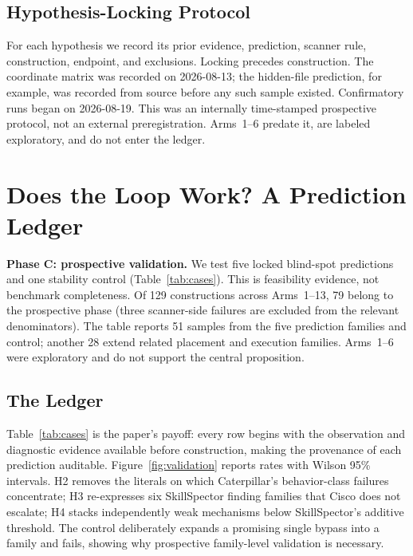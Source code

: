 \documentclass[sigconf,nonacm]{acmart}
\begin{document}
\subsection{Hypothesis-Locking Protocol}
For each hypothesis we record its prior evidence, prediction, scanner rule, construction, endpoint, and exclusions. Locking precedes construction. The coordinate matrix was recorded on 2026-08-13; the hidden-file prediction, for example, was recorded from source before any such sample existed. Confirmatory runs began on 2026-08-19. This was an internally time-stamped prospective protocol, not an external preregistration. Arms~1--6 predate it, are labeled exploratory, and do not enter the ledger.

\section{Does the Loop Work? A Prediction Ledger}
\label{sec:validate}

\noindent\textbf{Phase C: prospective validation.} We test five locked blind-spot predictions and one stability control (Table~\ref{tab:cases}). This is feasibility evidence, not benchmark completeness. Of 129 constructions across Arms~1--13, 79 belong to the prospective phase (three scanner-side failures are excluded from the relevant denominators). The table reports 51 samples from the five prediction families and control; another 28 extend related placement and execution families. Arms~1--6 were exploratory and do not support the central proposition.

\subsection{The Ledger}
Table~\ref{tab:cases} is the paper's payoff: every row begins with the observation and diagnostic evidence available before construction, making the provenance of each prediction auditable. Figure~\ref{fig:validation} reports rates with Wilson 95\% intervals. H2 removes the literals on which Caterpillar's behavior-class failures concentrate; H3 re-expresses six SkillSpector finding families that Cisco does not escalate; H4 stacks independently weak mechanisms below SkillSpector's additive threshold. The control deliberately expands a promising single bypass into a family and fails, showing why prospective family-level validation is necessary.
\end{document}
